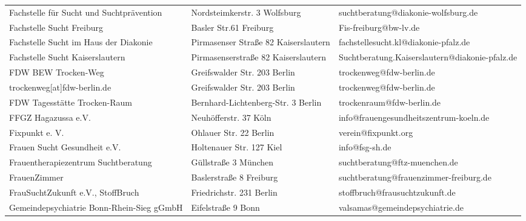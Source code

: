 {\begin{xltabular}{\textwidth} {
 >{\raggedright\arraybackslash}p{5cm}
 >{\raggedright\arraybackslash}X
 >{\raggedright\arraybackslash}p{5cm} }
Fachstelle für Sucht und Suchtprävention & Nordsteimkerstr. 3 Wolfsburg & suchtberatung@diakonie-wolfsburg.de \\
Fachstelle Sucht Freiburg & Basler Str.61 Freiburg & Fis-freiburg@bw-lv.de \\
Fachstelle Sucht im Haus der Diakonie & Pirmasenser Straße 82 Kaiserslautern & fachstellesucht.kl@diakonie-pfalz.de \\
Fachstelle Sucht Kaiserslautern & Pirmasenserstraße 82 Kaiserslautern & Suchtberatung.Kaiserslautern@diakonie-pfalz.de \\
FDW BEW Trocken-Weg & Greifswalder Str. 203 Berlin & trockenweg@fdw-berlin.de \\
trockenweg[at]fdw-berlin.de & Greifswalder Str. 203 Berlin & trockenweg@fdw-berlin.de \\
FDW Tagesstätte Trocken-Raum & Bernhard-Lichtenberg-Str. 3 Berlin & trockenraum@fdw-berlin.de \\
FFGZ Hagazussa e.V. & Neuhöfferstr. 37 Köln & info@frauengesundheitszentrum-koeln.de \\
Fixpunkt e. V. & Ohlauer Str. 22 Berlin & verein@fixpunkt.org \\
Frauen Sucht Gesundheit e.V. & Holtenauer Str. 127 Kiel & info@fsg-sh.de \\
Frauentherapiezentrum Suchtberatung & Güllstraße 3 München & suchtberatung@ftz-muenchen.de \\
FrauenZimmer & Baslerstraße 8 Freiburg & suchtberatung@frauenzimmer-freiburg.de \\
FrauSuchtZukunft e.V., StoffBruch & Friedrichstr. 231 Berlin & stoffbruch@frausuchtzukunft.de \\
Gemeindepsychiatrie Bonn-Rhein-Sieg gGmbH & Eifelstraße 9 Bonn & valsamas@gemeindepsychiatrie.de \\

\end{xltabular}}
